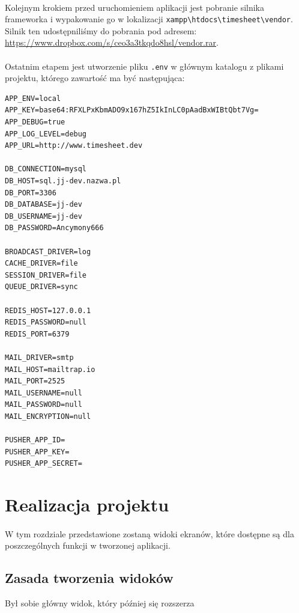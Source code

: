 \documentclass[a4paper, 12pt, oneside]{article}
\begin{document}
			\paragraph{}Kolejnym krokiem przed uruchomieniem aplikacji jest pobranie silnika frameworka i wypakowanie go w lokalizacji \verb+xampp\htdocs\timesheet\vendor+. Silnik ten udostępniliśmy do pobrania pod adresem: \url{https://www.dropbox.com/s/ceo3a3tkqdo8hsl/vendor.rar}.
			
			\paragraph{}Ostatnim etapem jest utworzenie pliku \verb+.env+ w głównym katalogu z plikami projektu, którego zawartość ma być następująca:\\
			
			\begin{footnotesize}
				\begin{lstlisting}[frame=single]  
APP_ENV=local
APP_KEY=base64:RFXLPxKbmADO9x167hZ5IkInLC0pAadBxWIBtQbt7Vg=
APP_DEBUG=true
APP_LOG_LEVEL=debug
APP_URL=http://www.timesheet.dev

DB_CONNECTION=mysql
DB_HOST=sql.jj-dev.nazwa.pl
DB_PORT=3306
DB_DATABASE=jj-dev
DB_USERNAME=jj-dev
DB_PASSWORD=Ancymony666

BROADCAST_DRIVER=log
CACHE_DRIVER=file
SESSION_DRIVER=file
QUEUE_DRIVER=sync

REDIS_HOST=127.0.0.1
REDIS_PASSWORD=null
REDIS_PORT=6379

MAIL_DRIVER=smtp
MAIL_HOST=mailtrap.io
MAIL_PORT=2525
MAIL_USERNAME=null
MAIL_PASSWORD=null
MAIL_ENCRYPTION=null

PUSHER_APP_ID=
PUSHER_APP_KEY=
PUSHER_APP_SECRET=
\end{lstlisting}
\end{footnotesize}
						
			
\section{Realizacja projektu}
	\paragraph{}W tym rozdziale przedstawione zostaną widoki ekranów, które dostępne są dla poszczególnych funkcji w tworzonej aplikacji. 
	\subsection{Zasada tworzenia widoków}
		Był sobie główny widok, który później się rozszerza
\end{document}
